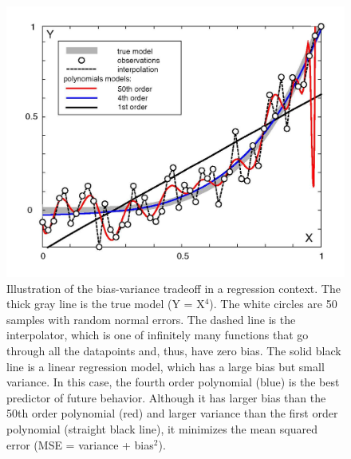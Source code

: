 \begin{figure}[htbp]
  \centering
  \includegraphics[width=500]{figures/biasVariance.jpg}
  \caption[Illustration of the bias-variance tradeoff in a regression context]
{Illustration of  the bias-variance tradeoff in  a regression context.
The thick gray  line is the true model (Y =  X$^4$). The white circles
are  50 samples with  random normal  errors.  The  dashed line  is the
interpolator,  which  is one  of  infinitely  many  functions that  go
through all the datapoints and,  thus, have zero bias. The solid black
line is  a linear regression model,  which has a large  bias but small
variance. In this case, the fourth order polynomial (blue) is the best
predictor of  future behavior.  Although  it has larger bias  than the
50th order polynomial  (red) and larger variance than  the first order
polynomial (straight black line),  it minimizes the mean squared error
(MSE = variance + bias$^2$).}
  \label{fig:biasVariance}
\end{figure}

